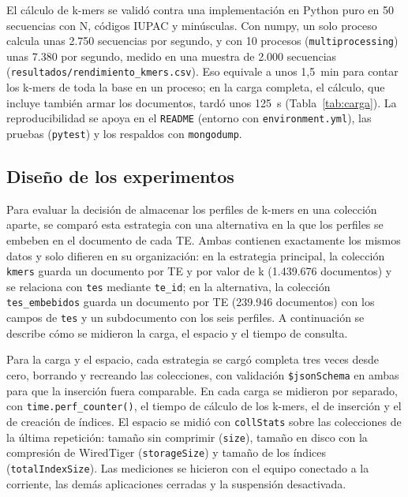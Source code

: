 \documentclass[unnumsec,namedate,webpdf,contemporary,large]{oup-authoring-template}
\begin{document}
El c\'alculo de k-mers se valid\'o contra una implementaci\'on en Python puro en 50 secuencias con N, c\'odigos IUPAC y min\'usculas. Con numpy, un solo proceso calcula unas 2.750 secuencias por segundo, y con 10 procesos (\texttt{multiprocessing}) unas 7.380 por segundo, medido en una muestra de 2.000 secuencias (\texttt{resultados/rendimiento\_kmers.csv}). Eso equivale a unos 1,5~min para contar los k-mers de toda la base en un proceso; en la carga completa, el c\'alculo, que incluye tambi\'en armar los documentos, tard\'o unos 125~s (Tabla~\ref{tab:carga}). La reproducibilidad se apoya en el \texttt{README} (entorno con \texttt{environment.yml}), las pruebas (\texttt{pytest}) y los respaldos con \texttt{mongodump}.

\subsection{Dise\~no de los experimentos}

Para evaluar la decisi\'on de almacenar los perfiles de k-mers en una colecci\'on aparte, se compar\'o esta estrategia con una alternativa en la que los perfiles se embeben en el documento de cada TE. Ambas contienen exactamente los mismos datos y solo difieren en su organizaci\'on: en la estrategia principal, la colecci\'on \texttt{kmers} guarda un documento por TE y por valor de k (1.439.676 documentos) y se relaciona con \texttt{tes} mediante \texttt{te\_id}; en la alternativa, la colecci\'on \texttt{tes\_embebidos} guarda un documento por TE (239.946 documentos) con los campos de \texttt{tes} y un subdocumento con los seis perfiles. A continuaci\'on se describe c\'omo se midieron la carga, el espacio y el tiempo de consulta.

Para la carga y el espacio, cada estrategia se carg\'o completa tres veces desde cero, borrando y recreando las colecciones, con validaci\'on \texttt{\$jsonSchema} en ambas para que la inserci\'on fuera comparable. En cada carga se midieron por separado, con \texttt{time.perf\_counter()}, el tiempo de c\'alculo de los k-mers, el de inserci\'on y el de creaci\'on de \'indices. El espacio se midi\'o con \texttt{collStats} sobre las colecciones de la \'ultima repetici\'on: tama\~no sin comprimir (\texttt{size}), tama\~no en disco con la compresi\'on de WiredTiger (\texttt{storageSize}) y tama\~no de los \'indices (\texttt{totalIndexSize}). Las mediciones se hicieron con el equipo conectado a la corriente, las dem\'as aplicaciones cerradas y la suspensi\'on desactivada.
\end{document}
